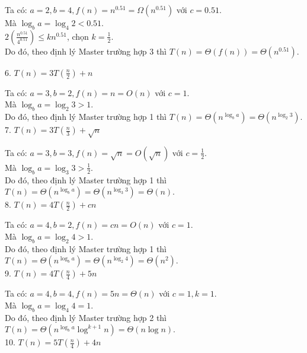 \documentclass[12pt, a4paper, fleqn]{article}
\begin{document}
		Ta có: $a = 2, b = 4, f(n) = n^{0.51} = \Omega (n^{0.51})$ với $c = 0.51$.\\
		Mà $\log_{b} a = \log_{4} 2 < 0.51$.\\
		$\displaystyle
		2 \left( \frac{n^{0.51}}{4^{0.51}} \right)  \leq kn^{0.51}$, chọn $\displaystyle
		k = \frac{1}{2}$.\\
		Do đó, theo định lý Master trường hợp 3 thì $T(n) = \Theta (f(n)) = \Theta (n^{0.51})$.
		\clearpage
				
		6. $\displaystyle
		T(n) = 3T\left( \frac{n}{2} \right) + n$
		
		Ta có: $a = 3, b = 2, f(n) = n = O (n)$ với $c = 1$.\\
		Mà $\log_{b} a = \log_{2} 3 > 1$.\\
		Do đó, theo định lý Master trường hợp 1 thì $T(n) = \Theta \left( n^{\log_{b} a} \right) = \Theta (n^{\log_{2} 3})$.
		\\
		
		7. $\displaystyle
		T(n) = 3T\left( \frac{n}{3} \right) + \sqrt{n}$	
		
		Ta có: $a = 3, b = 3, f(n) = \sqrt{n} = O \left( \sqrt{n} \right) $ với $c = \frac{1}{2}$.\\
		Mà $\displaystyle
		\log_{b} a = \log_{3} 3 > \frac{1}{2}$.\\
		Do đó, theo định lý Master trường hợp 1 thì $T(n) = \Theta \left( n^{\log_{b} a} \right) = \Theta (n^{\log_{3} 3}) = \Theta (n)$.
		\\
		
		8. $\displaystyle
		T(n) = 4T\left( \frac{n}{2} \right) + cn$
		
		Ta có: $a = 4, b = 2, f(n) = cn = O (n)$ với $c = 1$.\\
		Mà $\log_{b} a = \log_{2} 4 > 1$.\\
		Do đó, theo định lý Master trường hợp 1 thì $T(n) = \Theta \left( n^{\log_{b} a} \right) = \Theta (n^{\log_{2} 4}) = \Theta (n^2)$.
		\\
		
		9. $\displaystyle
		T(n) = 4T\left( \frac{n}{4} \right) + 5n$
		
		Ta có: $a = 4, b = 4, f(n) = 5n = \Theta (n)$ với $c = 1, k = 1$.\\
		Mà $\log_{b} a = \log_{4} 4 = 1$.\\
		Do đó, theo định lý Master trường hợp 2 thì $T(n) = \Theta \left( n^{\log_{b} a} \log^{k + 1} n \right) = \Theta (n\log n)$.
		\\
		
		10. $\displaystyle
		T(n) = 5T\left( \frac{n}{4} \right) + 4n$
		
\end{document}

